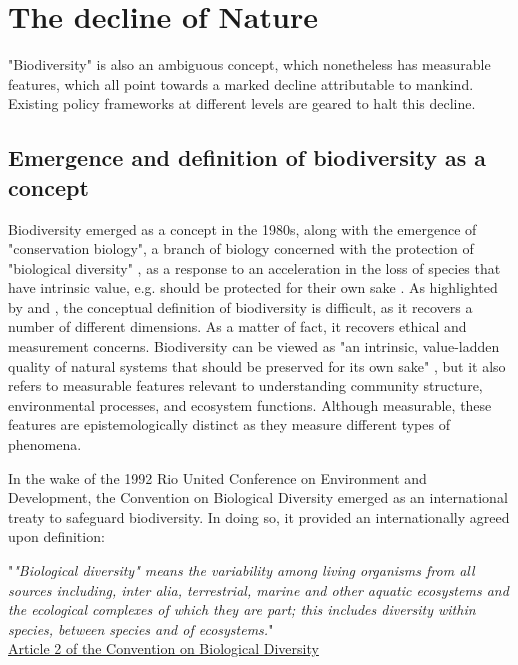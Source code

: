 \clearpage
\section*{The decline of Nature }

"Biodiversity" is also an ambiguous concept, which nonetheless has measurable features, which all point towards a marked decline attributable to mankind. Existing policy frameworks at different levels are geared to halt this decline. 


\subsection*{Emergence and definition of biodiversity as a concept}

Biodiversity emerged as a concept in the 1980s, along with the emergence of "conservation biology", a branch of biology concerned with the protection of "biological diversity" \citep{soule_what_1985}, as a response to an acceleration in the loss of species  that have intrinsic value, e.g. should be protected for their own sake \citep{soule_conservation_1986}. As highlighted by \cite{mouysset_diversity_2023} and \cite{VanDyke2008}, the conceptual definition of biodiversity is difficult, as it recovers a number of different dimensions. As a matter of fact, it recovers ethical and measurement concerns. Biodiversity can be viewed as "an intrinsic, value-ladden quality of natural systems that should be preserved for its own sake" \citep{VanDyke2008, mouysset_diversity_2023}, but it also refers to measurable features relevant to understanding community structure, environmental processes, and ecosystem functions. Although measurable, these features are epistemologically distinct as they measure different types of phenomena. 

In the wake of the 1992 Rio United Conference on Environment and Development,  the Convention on Biological Diversity emerged as an international treaty to safeguard biodiversity. In doing so, it provided an internationally agreed upon definition:

\begin{displayquote}
"\textit{"Biological diversity" means the variability among living organisms from all sources including, inter alia, terrestrial, marine and other aquatic ecosystems and the ecological complexes of which they are part; this includes diversity within species, between species and of ecosystems.}"\\
\small{\href{https://www.cbd.int/convention/articles/default.shtml?a=cbd-02}{Article 2 of the Convention on Biological Diversity}}
\end{displayquote}

